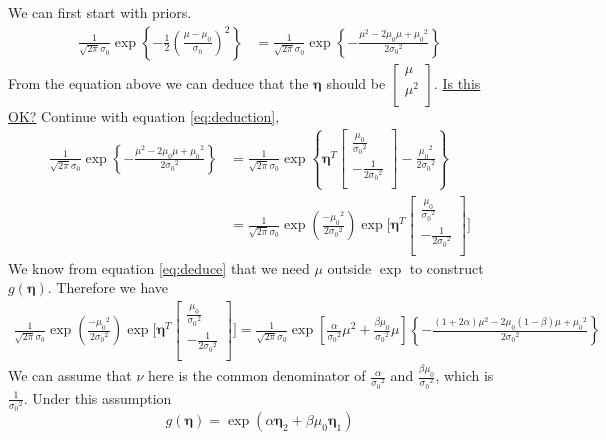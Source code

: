 \documentclass[12pt]{article}
\begin{document}
We can first start with priors.
\begin{equation}\label{eq:deduction}
\begin{split}
    \frac{1}{\sqrt{2 \pi} \sigma_{0}} \exp \left\{-\frac{1}{2}\left(\frac{\mu-\mu_{0}}{\sigma_{0}}\right)^{2}\right\}&=\frac{1}{\sqrt{2 \pi} \sigma_{0}}\exp \left\{-\frac{\mu^2-2{\mu}_0\mu+{\mu_0}^2}{2{\sigma_0}^2}\right\}
\end{split}
\end{equation}
From the equation above we can deduce that the $\boldsymbol{\eta}$ should be $
\begin{bmatrix}
\mu\\
\mu^2\\
\end{bmatrix}$.
\underline{Is this OK?}
Continue with equation \ref{eq:deduction},
\begin{displaymath}\label{eq:deduce}
\begin{split}
\frac{1}{\sqrt{2 \pi} \sigma_{0}}\exp \left\{-\frac{\mu^2-2{\mu}_0\mu+{\mu_0}^2}{2{\sigma_0}^2}\right\}&=\frac{1}{\sqrt{2 \pi} \sigma_{0}}\exp \left\{\boldsymbol{\eta}^T\begin{bmatrix}
\frac{\mu_0}{{\sigma_0}^2}\\
-\frac{1}{2{\sigma_0}^2}\\
\end{bmatrix}-\frac{{\mu_0}^2}{2{\sigma_0}^2}\right\}\\
&=\frac{1}{\sqrt{2 \pi} \sigma_{0}}\exp{(\frac{-{\mu_0}^2}{2{\sigma_0}^2})\exp\Big[\boldsymbol{\eta}^T\begin{bmatrix}
\frac{\mu_0}{{\sigma_0}^2}\\
-\frac{1}{2{\sigma_0}^2}\\
\end{bmatrix}\Big]}
\end{split}
\end{displaymath}
We know from equation \ref{eq:deduce} that we need $\mu$ outside $\exp$ to construct $g(\boldsymbol{\eta})$.
Therefore we have
\begin{equation}
\begin{split}
    \frac{1}{\sqrt{2 \pi} \sigma_{0}}\exp{(\frac{-{\mu_0}^2}{2{\sigma_0}^2})\exp\Big[\boldsymbol{\eta}^T\begin{bmatrix}
\frac{\mu_0}{{\sigma_0}^2}\\
-\frac{1}{2{\sigma_0}^2}\\
\end{bmatrix}\Big]}
=\frac{1}{\sqrt{2 \pi} \sigma_{0}}\exp{[\frac{\alpha}{{\sigma_0}^2}{\mu}^2+\frac{\beta\mu_0}{{\sigma_0}^2}\mu]\left\{-\frac{(1+2\alpha)\mu^2-2{\mu_0}(1-\beta)\mu+{\mu_0}^2}{2{\sigma_0}^2}\right\}}
\end{split}
\end{equation}
We can assume that $\nu$ here is the common denominator of $\frac{\alpha}{{\sigma_0}^2}$ and $\frac{\beta\mu_0}{{\sigma_0}^2}$, which is $\frac{1}{{\sigma_0}^2}$. Under this assumption $$g(\boldsymbol{\eta})=\exp(\alpha{\boldsymbol{\eta}}_2+\beta\mu_0{\boldsymbol{\eta}}_1)$$
\end{document}
